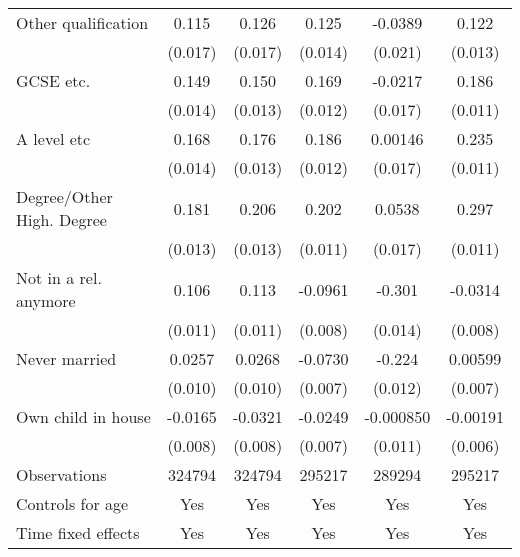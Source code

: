 \begin{table}[htbp]
{\begin{tabular}{l*{5}{c}}
\addlinespace
Other qualification&    0.115\sym{***}&    0.126\sym{***}&    0.125\sym{***}&  -0.0389         &    0.122\sym{***}\\
                &  (0.017)         &  (0.017)         &  (0.014)         &  (0.021)         &  (0.013)         \\
\addlinespace
GCSE etc.       &    0.149\sym{***}&    0.150\sym{***}&    0.169\sym{***}&  -0.0217         &    0.186\sym{***}\\
                &  (0.014)         &  (0.013)         &  (0.012)         &  (0.017)         &  (0.011)         \\
\addlinespace
A level etc     &    0.168\sym{***}&    0.176\sym{***}&    0.186\sym{***}&  0.00146         &    0.235\sym{***}\\
                &  (0.014)         &  (0.013)         &  (0.012)         &  (0.017)         &  (0.011)         \\
\addlinespace
Degree/Other High. Degree&    0.181\sym{***}&    0.206\sym{***}&    0.202\sym{***}&   0.0538\sym{**} &    0.297\sym{***}\\
                &  (0.013)         &  (0.013)         &  (0.011)         &  (0.017)         &  (0.011)         \\
\addlinespace
Not in a rel. anymore&    0.106\sym{***}&    0.113\sym{***}&  -0.0961\sym{***}&   -0.301\sym{***}&  -0.0314\sym{***}\\
                &  (0.011)         &  (0.011)         &  (0.008)         &  (0.014)         &  (0.008)         \\
\addlinespace
Never married   &   0.0257\sym{**} &   0.0268\sym{**} &  -0.0730\sym{***}&   -0.224\sym{***}&  0.00599         \\
                &  (0.010)         &  (0.010)         &  (0.007)         &  (0.012)         &  (0.007)         \\
\addlinespace
Own child in house&  -0.0165\sym{*}  &  -0.0321\sym{***}&  -0.0249\sym{***}&-0.000850         & -0.00191         \\
                &  (0.008)         &  (0.008)         &  (0.007)         &  (0.011)         &  (0.006)         \\
\midrule
Observations    &   324794         &   324794         &   295217         &   289294         &   295217         \\
Controls for age&      Yes         &      Yes         &      Yes         &      Yes         &      Yes         \\
Time fixed effects&      Yes         &      Yes         &      Yes         &      Yes         &      Yes         \\

\end{tabular}}
\end{table}
